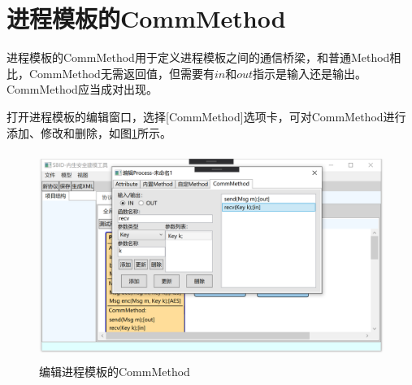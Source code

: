 \section{进程模板的CommMethod}
进程模板的CommMethod用于定义进程模板之间的通信桥梁，和普通Method相比，CommMethod无需返回值，但需要有$in$和$out$指示是输入还是输出。CommMethod应当成对出现。
\par
打开进程模板的编辑窗口，选择[CommMethod]选项卡，可对CommMethod进行添加、修改和删除，如图\ref{process_edit_commmethod}所示。
\begin{figure}[h]
	\centering
	\includegraphics[width=12cm,height=6.75cm]{imgs/process_edit_commmethod.png}
	\caption{编辑进程模板的CommMethod}
	\label{process_edit_commmethod}
	\end{figure}
\par
